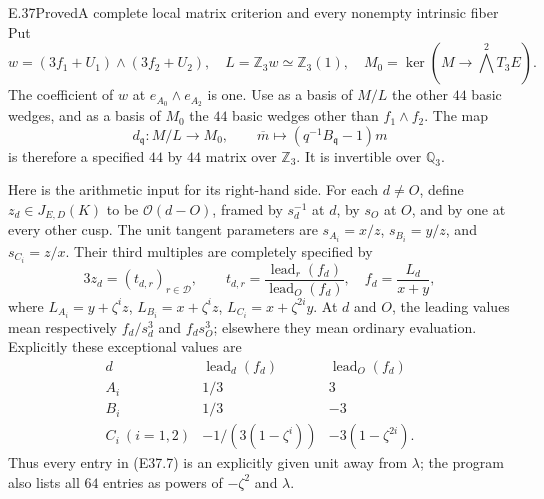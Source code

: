 \begin{statement}{E.37}{Proved}{A complete local matrix criterion and every nonempty intrinsic fiber}
Put
\[
 w=(3f_1+U_1)\wedge(3f_2+U_2),\quad
 L=\mathbb Z_3w\simeq\mathbb Z_3(1),\quad
 M_0=\ker(M\to\bigwedge^2T_3E).
 \tag{E37.5}
\]
The coefficient of $w$ at $e_{A_0}\wedge e_{A_2}$ is one.
Use as a basis of $M/L$ the other $44$ basic wedges,
and as a basis of $M_0$ the $44$ basic wedges other than
$f_1\wedge f_2$. The map
\[
 d_{\mathfrak q}:M/L\longrightarrow M_0,
 \qquad \overline m\longmapsto(q^{-1}B_{\mathfrak q}-1)m
 \tag{E37.6}
\]
is therefore a specified $44$ by $44$ matrix over $\mathbb Z_3$.
It is invertible over $\mathbb Q_3$.

Here is the arithmetic input for its right-hand side.
For each $d\ne O$, define $z_d\in J_{E,D}(K)$ to be
$\mathcal O(d-O)$, framed by $s_d^{-1}$ at $d$, by $s_O$
at $O$, and by one at every other cusp. The unit tangent
parameters are $s_{A_i}=x/z$, $s_{B_i}=y/z$,
and $s_{C_i}=z/x$.
Their third multiples are completely specified by
\[
 3z_d=(t_{d,r})_{r\in\mathcal D},\qquad
 t_{d,r}=\frac{\operatorname{lead}_r(f_d)}
                     {\operatorname{lead}_O(f_d)},\quad
 f_d=\frac{L_d}{x+y},
 \tag{E37.7}
\]
where
$L_{A_i}=y+\zeta^iz$, $L_{B_i}=x+\zeta^iz$,
$L_{C_i}=x+\zeta^{2i}y$.
At $d$ and $O$, the leading values mean respectively
$f_d/s_d^3$ and $f_ds_O^3$; elsewhere they mean ordinary
evaluation. Explicitly these exceptional values are
\[
 \begin{array}{c|cc}
 d&\operatorname{lead}_d(f_d)&\operatorname{lead}_O(f_d)\\ \hline
 A_i&1/3&3\\ B_i&1/3&-3\\
 C_i\ (i=1,2)&-1/(3(1-\zeta^i))&-3(1-\zeta^{2i}).
 \end{array}
 \tag{E37.8}
\]
Thus every entry in (E37.7) is an explicitly given unit
away from $\lambda$; the program also lists all $64$
entries as powers of $-\zeta^2$ and $\lambda$.


\end{statement}
